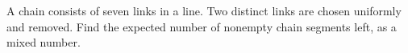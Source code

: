 A chain consists of seven links in a line. Two distinct links are chosen uniformly and removed. Find the expected number of nonempty chain segments left, as a mixed number.
